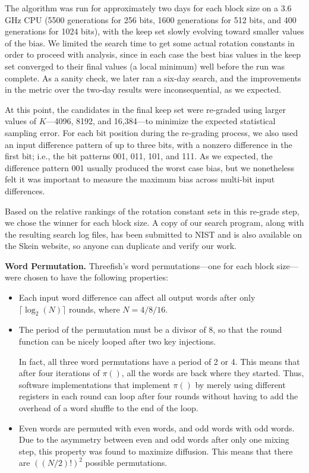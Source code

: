 \documentclass[11pt,twoside]{article}
\begin{document}
The algorithm was run for approximately two days for each block size on a 3.6 GHz CPU (5500 generations for 256 bits, 1600 generations for 512 bits, and 400 generations for 1024 bits), with the keep set slowly evolving toward smaller values of the bias.  We limited the search time to get some actual rotation constants in order to proceed with analysis, since in each case the best bias values in the keep set converged to their final values (a local minimum) well before the run was complete. As a sanity check, we later ran a six-day search, and the improvements in the metric over the two-day results were inconsequential, as we expected.

At this point, the candidates in the final keep set were re-graded using larger values of $K$---4096, 8192, and 16,384---to minimize the expected statistical sampling error. For each bit position during the re-grading process, we also used an input difference pattern of up to three bits, with a nonzero difference in the first bit; i.e., the bit patterns 001, 011, 101, and 111. As we expected, the difference pattern 001 usually produced the worst case bias, but we nonetheless felt it was important to measure the maximum bias across multi-bit input differences.

Based on the relative rankings of the rotation constant sets in this re-grade step, we chose the winner for each block size.  A copy of our search program, along with the resulting search log files, has been submitted to NIST and is also available on the Skein website, so anyone can duplicate and verify our work.

{\bf Word Permutation.}  Threefish's word permutations---one for each block size---were chosen to have the following properties:

\begin{itemize}
\item Each input word difference can affect all output words after only $\lceil \log_2(N)\rceil$ rounds, where $N=4/8/16$.

\item The period of the permutation must be a divisor of 8, so that the round function can be nicely looped after two key injections.

In fact, all three word permutations have a period of 2 or 4.  This means that after four iterations of $\pi()$, all the words are back where they started.  Thus, software implementations that implement $\pi()$ by merely using different registers in each round can loop after four rounds without having to add the overhead of a word shuffle to the end of the loop.

\item Even words are permuted with even words, and odd words with odd words.  Due to the asymmetry between even and odd words after only one mixing step, this property was found to maximize diffusion.  This means that there are $((N/2)!)^2$ possible permutations.
\end{itemize}
\end{document}

